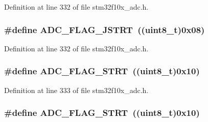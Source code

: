Definition at line 332 of file stm32f10x\+\_\+adc.\+h.

\subsubsection[{\texorpdfstring{A\+D\+C\+\_\+\+F\+L\+A\+G\+\_\+\+J\+S\+T\+RT}{ADC_FLAG_JSTRT}}]{\setlength{\rightskip}{0pt plus 5cm}\#define A\+D\+C\+\_\+\+F\+L\+A\+G\+\_\+\+J\+S\+T\+RT~(({\bf uint8\+\_\+t})0x08)}\hypertarget{group___a_d_c__flags__definition_ga278f4e866f4322c1120bf0db5301c432}{}\label{group___a_d_c__flags__definition_ga278f4e866f4322c1120bf0db5301c432}


Definition at line 332 of file stm32f10x\+\_\+adc.\+h.

\subsubsection[{\texorpdfstring{A\+D\+C\+\_\+\+F\+L\+A\+G\+\_\+\+S\+T\+RT}{ADC_FLAG_STRT}}]{\setlength{\rightskip}{0pt plus 5cm}\#define A\+D\+C\+\_\+\+F\+L\+A\+G\+\_\+\+S\+T\+RT~(({\bf uint8\+\_\+t})0x10)}\hypertarget{group___a_d_c__flags__definition_gad0c59ae7749c69b5b91f2c533db1b619}{}\label{group___a_d_c__flags__definition_gad0c59ae7749c69b5b91f2c533db1b619}


Definition at line 333 of file stm32f10x\+\_\+adc.\+h.

\subsubsection[{\texorpdfstring{A\+D\+C\+\_\+\+F\+L\+A\+G\+\_\+\+S\+T\+RT}{ADC_FLAG_STRT}}]{\setlength{\rightskip}{0pt plus 5cm}\#define A\+D\+C\+\_\+\+F\+L\+A\+G\+\_\+\+S\+T\+RT~(({\bf uint8\+\_\+t})0x10)}\hypertarget{group___a_d_c__flags__definition_gad0c59ae7749c69b5b91f2c533db1b619}{}\label{group___a_d_c__flags__definition_gad0c59ae7749c69b5b91f2c533db1b619}



